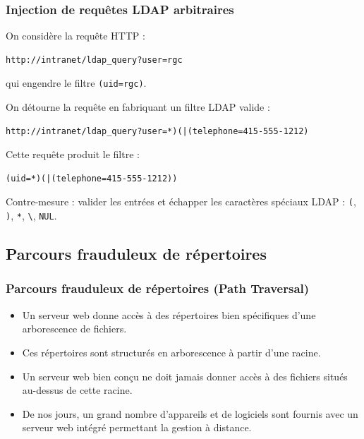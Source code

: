 \documentclass{beamer}
\def\emptyline{\vspace{10pt}}
\begin{document}
\begin{frame}[fragile]
\frametitle{Injection de requêtes LDAP arbitraires}
On considère la requête HTTP :
\begin{verbatim}
http://intranet/ldap_query?user=rgc
\end{verbatim}
qui engendre le filtre \texttt{(uid=rgc)}.

\emptyline
On détourne la requête en fabriquant un filtre LDAP valide :
\begin{small}
\begin{verbatim}
http://intranet/ldap_query?user=*)(|(telephone=415-555-1212)
\end{verbatim}
\end{small}
Cette requête produit le filtre :
\begin{verbatim}
(uid=*)(|(telephone=415-555-1212))
\end{verbatim}

\alert{Contre-mesure} : valider les entrées et échapper les caractères spéciaux LDAP : \texttt{(}, \texttt{)}, \texttt{*}, \texttt{\textbackslash}, \texttt{NUL}.
\end{frame}


\subsection{Parcours frauduleux de répertoires}

\begin{frame}
\frametitle{Parcours frauduleux de répertoires (Path Traversal)}

\begin{itemize}
\item Un serveur web donne accès à des répertoires bien spécifiques d'une arborescence de fichiers.
\item Ces répertoires sont structurés en arborescence à partir d'une racine.
\item Un serveur web bien conçu ne doit \alert{jamais} donner accès à des fichiers situés au-dessus de cette racine.
\item De nos jours, un grand nombre d'appareils et de logiciels sont fournis avec un serveur web intégré permettant la gestion à distance.
\end{itemize}
\end{frame}
\end{document}
